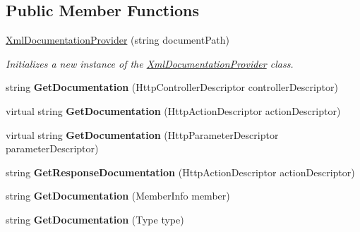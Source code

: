 \subsection*{Public Member Functions}
\begin{DoxyCompactItemize}
\item 
\hyperlink{class_w_s1aarsproeve_1_1_areas_1_1_help_page_1_1_xml_documentation_provider_adf766481074f11a61a62c109e8ca494a}{Xml\+Documentation\+Provider} (string document\+Path)
\begin{DoxyCompactList}\small\item\em Initializes a new instance of the \hyperlink{class_w_s1aarsproeve_1_1_areas_1_1_help_page_1_1_xml_documentation_provider}{Xml\+Documentation\+Provider} class. \end{DoxyCompactList}\item 
\hypertarget{class_w_s1aarsproeve_1_1_areas_1_1_help_page_1_1_xml_documentation_provider_a62d5df3108c19f5f866a0735ca31c66c}{}string {\bfseries Get\+Documentation} (Http\+Controller\+Descriptor controller\+Descriptor)\label{class_w_s1aarsproeve_1_1_areas_1_1_help_page_1_1_xml_documentation_provider_a62d5df3108c19f5f866a0735ca31c66c}

\item 
\hypertarget{class_w_s1aarsproeve_1_1_areas_1_1_help_page_1_1_xml_documentation_provider_a6b41db97bb9355621a6e7421930a4e5d}{}virtual string {\bfseries Get\+Documentation} (Http\+Action\+Descriptor action\+Descriptor)\label{class_w_s1aarsproeve_1_1_areas_1_1_help_page_1_1_xml_documentation_provider_a6b41db97bb9355621a6e7421930a4e5d}

\item 
\hypertarget{class_w_s1aarsproeve_1_1_areas_1_1_help_page_1_1_xml_documentation_provider_a8206ae13718ee76159baea1ca5ad69c5}{}virtual string {\bfseries Get\+Documentation} (Http\+Parameter\+Descriptor parameter\+Descriptor)\label{class_w_s1aarsproeve_1_1_areas_1_1_help_page_1_1_xml_documentation_provider_a8206ae13718ee76159baea1ca5ad69c5}

\item 
\hypertarget{class_w_s1aarsproeve_1_1_areas_1_1_help_page_1_1_xml_documentation_provider_a0e80a08020f9ba0d6391827432a4b125}{}string {\bfseries Get\+Response\+Documentation} (Http\+Action\+Descriptor action\+Descriptor)\label{class_w_s1aarsproeve_1_1_areas_1_1_help_page_1_1_xml_documentation_provider_a0e80a08020f9ba0d6391827432a4b125}

\item 
\hypertarget{class_w_s1aarsproeve_1_1_areas_1_1_help_page_1_1_xml_documentation_provider_a682e3ea6efcb4684c6033c7a218f1521}{}string {\bfseries Get\+Documentation} (Member\+Info member)\label{class_w_s1aarsproeve_1_1_areas_1_1_help_page_1_1_xml_documentation_provider_a682e3ea6efcb4684c6033c7a218f1521}

\item 
\hypertarget{class_w_s1aarsproeve_1_1_areas_1_1_help_page_1_1_xml_documentation_provider_af138b62936d5d21a65a87858d252ebbf}{}string {\bfseries Get\+Documentation} (Type type)\label{class_w_s1aarsproeve_1_1_areas_1_1_help_page_1_1_xml_documentation_provider_af138b62936d5d21a65a87858d252ebbf}

\end{DoxyCompactItemize}


